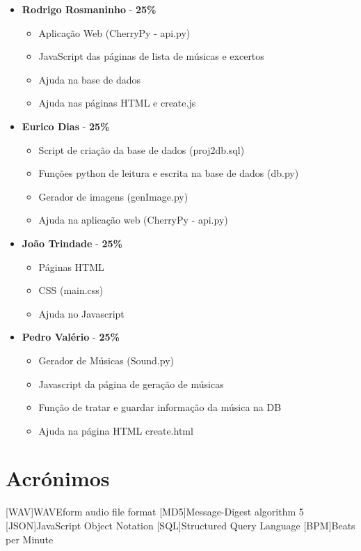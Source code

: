 \documentclass{report}
\begin{document}
\begin{itemize}
	\item \textbf{Rodrigo Rosmaninho} - \textbf{25\%}
		\begin{itemize}
			\item Aplicação Web (CherryPy - api.py)
			\item JavaScript das páginas de lista de músicas e excertos
			\item Ajuda na base de dados
			\item Ajuda nas páginas HTML e create.js
		\end{itemize}
	\item \textbf{Eurico Dias} - \textbf{25\%}
		\begin{itemize}
			\item Script de criação da base de dados (proj2db.sql)
			\item Funções python de leitura e escrita na base de dados (db.py)
			\item Gerador de imagens (genImage.py)
			\item Ajuda na aplicação web (CherryPy - api.py)
		\end{itemize}
	\item \textbf{João Trindade} - \textbf{25\%}
		\begin{itemize}
			\item Páginas HTML
			\item CSS (main.css)
			\item Ajuda no Javascript
		\end{itemize}
	\item \textbf{Pedro Valério} - \textbf{25\%}
		\begin{itemize}
			\item Gerador de Músicas (Sound.py)
			\item Javascript da página de geração de músicas
			\item Função de tratar e guardar informação da música na DB
			\item Ajuda na página HTML create.html
		\end{itemize}

\end{itemize}

\chapter*{Acrónimos}
\begin{acronym}
	[WAV]{WAVEform audio file format}
	[MD5]{Message-Digest algorithm 5}
	[JSON]{JavaScript Object Notation}
	[SQL]{Structured Query Language}
	[BPM]{Beats per Minute}
\end{acronym}


\end{document}
